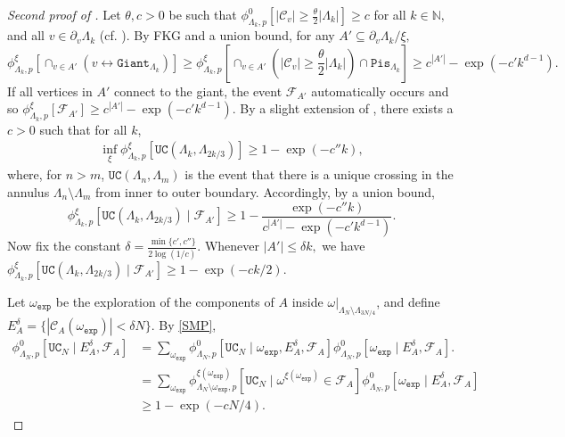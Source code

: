 \documentclass[article,11pt,reqno]{amsart}
\DeclareMathOperator*{\UC}{\mathtt{UC}}
\newcommand{\cc}{\leftrightarrow}
\begin{document}
\begin{appendix}
\begin{proof}[Second proof of ]
Let $\theta,c>0$ be such that $\phi_{\Lambda_k,p}^{0}[ |\mathcal{C}_v|\geq \frac{\theta}{2} |\Lambda_k|]\geq c$ for all $k\in \mathbb{N},$ and all $v\in \partial_v \Lambda_k$ (cf. ). By FKG and a union bound, for any $A'\subseteq \partial_v \Lambda_k/\xi ,$  
$$
\phi^{\xi}_{\Lambda_k,p}\left[ \cap_{v\in A'} (v\cc \mathtt{Giant}_{\Lambda_k})\right]\geq \phi^{\xi}_{\Lambda_k,p}\left[ \cap_{v\in A'} (|\mathcal{C}_v|\geq \frac{\theta}{2}|\Lambda_k|)\cap \mathtt{Pis}_{\Lambda_k}\right]\geq c^{|A'|}-\exp(-c'k^{d-1}).
$$
If all vertices in $A'$ connect to the giant, the event $\mathcal{F}_{A'}$ automatically occurs and so  $\phi^{\xi}_{\Lambda_k,p}[\mathcal{F}_{A'}]\geq c^{|A'|}-\exp(-c'k^{d-1}).$ By a slight extension of \cite[Lemma 4.8]{hansen2023uniform}, there exists a $c>0$ such that for all $k$, 
\begin{align}\label{eq:last}
  \inf_{\xi} \phi^{\xi}_{\Lambda_k,p}[\mathtt{UC}(\Lambda_k,\Lambda_{2k/3})]\geq 1-\exp(-c''k),   
\end{align}
where, for $n>m$, $\mathtt{UC}(\Lambda_n,\Lambda_m)$ is the event that there is a unique crossing in the annulus $\Lambda_n\setminus \Lambda_m$ from inner to outer boundary. Accordingly, by a union bound,
$$
\phi^{\xi}_{\Lambda_k,p}[\mathtt{UC}(\Lambda_k, \Lambda_{2k/3})\mid \mathcal{F}_{A'}]\geq 1-\frac{\exp(-c''k)}{c^{|A'|}-\exp(-c'k^{d-1})}.
$$
Now fix the constant $\delta =\frac{\min\{c',c''\}}{2\log(1/c)}$. Whenever $|A'|\leq \delta k ,$ we have $\phi^{\xi}_{\Lambda_k,p}[\mathtt{UC}(\Lambda_k,\Lambda_{2k/3})\mid \mathcal{F}_{A'}]\geq 1-\exp(-ck/2).$


Let $\omega_{\mathtt{exp}}$ be the exploration of the components of $A$ inside $\omega\vert_{\Lambda_N\setminus\Lambda_{3N/4}}$, %
and define $E^\delta_A=\{|\mathcal{C}_A(\omega_{\mathtt{exp}})| < \delta N \}.$ %
By \eqref{SMP}, %
\begin{align*}
\phi^{0}_{\Lambda_N,p}[\mathtt{UC}_N \mid E^\delta_A, \mathcal{F}_A]
& = \sum_{\omega_{\mathtt{exp}}}\phi^{0}_{\Lambda_N,p}[ \mathtt{UC}_N \mid \omega_{\mathtt{exp}},E^\delta_A, \mathcal{F}_A] \phi^{0}_{\Lambda_N,p}[\omega_{\mathtt{exp}} \mid  E^\delta_A, \mathcal{F}_A].
\\
&= \sum_{\omega_{\mathtt{exp}}}\phi^{\xi(\omega_{\mathtt{exp}})}_{\Lambda_{N}\setminus \omega_{\mathtt{exp}},p}[ \mathtt{UC}_N \mid  \omega^{\xi(\omega_{\mathtt{\exp}})}\in\mathcal{F}_{A}] \phi^{0}_{\Lambda_N,p}[\omega_{\mathtt{exp}} \mid  E^\delta_A, \mathcal{F}_A] \\
&\geq  1- \exp(- c N/4). 
\end{align*}




\end{proof}
\end{appendix}
\end{document}
